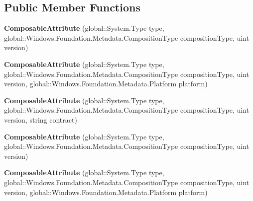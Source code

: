 \subsection*{Public Member Functions}
\begin{DoxyCompactItemize}
\item 
\mbox{\label{class_windows_1_1_foundation_1_1_metadata_1_1_composable_attribute_a9698d1ccfc15873da70639d7c273f978}} 
{\bfseries Composable\+Attribute} (global\+::\+System.\+Type type, global\+::\+Windows.\+Foundation.\+Metadata.\+Composition\+Type composition\+Type, uint version)
\item 
\mbox{\label{class_windows_1_1_foundation_1_1_metadata_1_1_composable_attribute_ac7f7df8b8f0df32c124854576b18bd79}} 
{\bfseries Composable\+Attribute} (global\+::\+System.\+Type type, global\+::\+Windows.\+Foundation.\+Metadata.\+Composition\+Type composition\+Type, uint version, global\+::\+Windows.\+Foundation.\+Metadata.\+Platform platform)
\item 
\mbox{\label{class_windows_1_1_foundation_1_1_metadata_1_1_composable_attribute_af1f14e4b9b6a4de568817fdeb25c51b5}} 
{\bfseries Composable\+Attribute} (global\+::\+System.\+Type type, global\+::\+Windows.\+Foundation.\+Metadata.\+Composition\+Type composition\+Type, uint version, string contract)
\item 
\mbox{\label{class_windows_1_1_foundation_1_1_metadata_1_1_composable_attribute_a9698d1ccfc15873da70639d7c273f978}} 
{\bfseries Composable\+Attribute} (global\+::\+System.\+Type type, global\+::\+Windows.\+Foundation.\+Metadata.\+Composition\+Type composition\+Type, uint version)
\item 
\mbox{\label{class_windows_1_1_foundation_1_1_metadata_1_1_composable_attribute_ac7f7df8b8f0df32c124854576b18bd79}} 
{\bfseries Composable\+Attribute} (global\+::\+System.\+Type type, global\+::\+Windows.\+Foundation.\+Metadata.\+Composition\+Type composition\+Type, uint version, global\+::\+Windows.\+Foundation.\+Metadata.\+Platform platform)

\end{DoxyCompactItemize}
